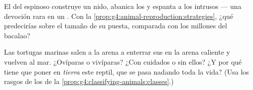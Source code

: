 \begin{exercise}[$\star\star$]\label{exo:g4:animal-reproduction:10}
El  del espinoso construye un nido, abanica los  y espanta
a los intrusos --- una devoción rara en un . Con la
\cref{prop:g4:animal-reproduction:strategies}, ¿qué predecirías sobre
el tamaño de su puesta, comparada con los millones del bacalao?
\end{exercise}

\begin{exercise}[$\star\star\star$]\label{exo:g4:animal-reproduction:11}
Las tortugas marinas salen a la arena a enterrar sus  en la
arena caliente y vuelven al mar. ¿Ovíparas o vivíparas? ¿Con cuidados
o sin ellos? ¿Y por qué tiene que poner en \emph{tierra} este reptil,
que se pasa nadando toda la vida? (Usa los rasgos de los  de
la \cref{prop:g4:classifying-animals:classes}.)
\end{exercise}
